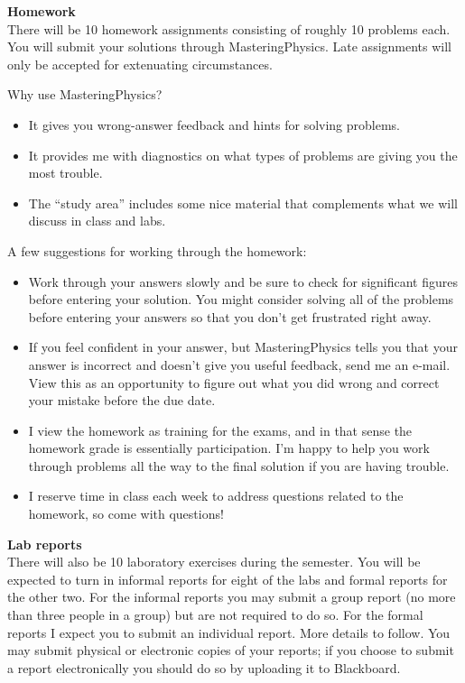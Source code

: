 \documentclass[11pt,letterpaper]{article}
\begin{document}
\textbf{Homework}\\
There will be 10 homework assignments consisting of roughly 10 problems each. You will submit your solutions through MasteringPhysics. Late assignments will only be accepted for extenuating circumstances.

Why use MasteringPhysics?
\begin{itemize}\itemsep -5pt
\item It gives you wrong-answer feedback and hints for solving problems.
\item It provides me with diagnostics on what types of problems are giving you the most trouble.
\item The ``study area'' includes some nice material that complements what we will discuss in class and labs.
\end{itemize}

A few suggestions for working through the homework:
\begin{itemize}\itemsep -5pt
\item Work through your answers slowly and be sure to check for significant figures before entering your solution. You might consider solving all of the problems before entering your answers so that you don't get frustrated right away.
\item If you feel confident in your answer, but MasteringPhysics tells you that your answer is incorrect and doesn't give you useful feedback, send me an e-mail. View this as an opportunity to figure out what you did wrong and correct your mistake before the due date.%
\item I view the homework as training for the exams, and in that sense the homework grade is essentially participation. I'm happy to help you work through problems all the way to the final solution if you are having trouble. 
\item I reserve time in class each week to address questions related to the homework, so come with questions!
\end{itemize}

\textbf{Lab reports}\\
There will also be 10 laboratory exercises during the semester. You will be expected to turn in informal reports for eight of the labs and formal reports for the other two. For the informal reports you may submit a group report (no more than three people in a group) but are not required to do so. For the formal reports I expect you to submit an individual report. More details to follow. You may submit physical or electronic copies of your reports; if you choose to submit a report electronically you should do so by uploading it to Blackboard.
\end{document}
